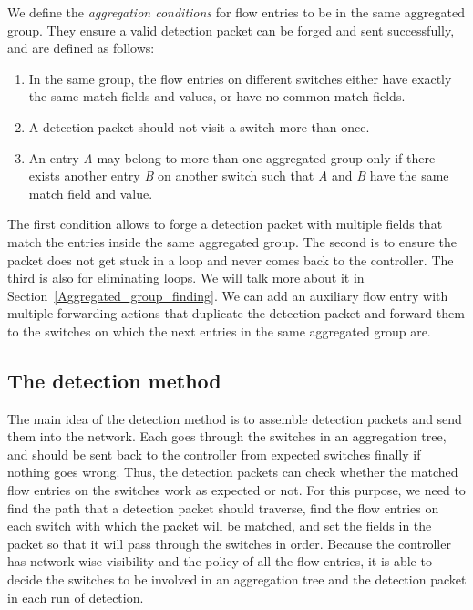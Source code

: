 \documentclass[conference]{IEEEtran}
\begin{document}
We define the \textit{aggregation conditions} for flow entries to be in the same aggregated group. They ensure a valid detection packet can be forged and sent successfully, and are defined as follows:
\begin{enumerate}
\item
In the same group, the flow entries on different switches either have exactly the same match fields and values, or have no common match fields.
\item
A detection packet should not visit a switch more than once.
\item
An entry \textit{A} may belong to more than one aggregated group only if there exists another entry \textit{B} on another switch such that \textit{A} and \textit{B} have the same match field and value.
\end{enumerate}

The first condition allows to forge a detection packet with multiple fields that match the entries inside the same aggregated group. The second is to ensure the packet does not get stuck in a loop and never comes back to the controller. The third is also for eliminating loops. We will talk more about it in Section~\ref{Aggregated_group_finding}. We can add an auxiliary flow entry with multiple forwarding actions that duplicate the detection packet and forward them to the switches on which the next entries in the same aggregated group are.

\subsection{The detection method}
\label{Detection_method}

The main idea of the detection method is to assemble detection packets and send them into the network. Each goes through the switches in an aggregation tree, and should be sent back to the controller from expected switches finally if nothing goes wrong. Thus, the detection packets can check whether the matched flow entries on the switches work as expected or not. For this purpose, we need to find the path that a detection packet should traverse, find the flow entries on each switch with which the packet will be matched, and set the fields in the packet so that it will pass through the switches in order. Because the controller has network-wise visibility and the policy of all the flow entries, it is able to decide the switches to be involved in an aggregation tree and the detection packet in each run of detection. 
\end{document}

